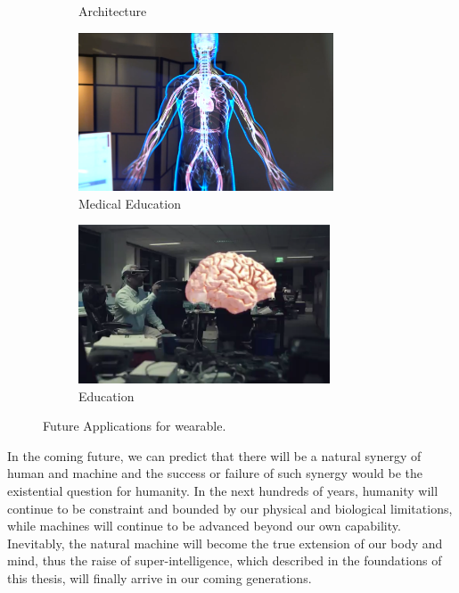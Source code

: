 \begin{figure}
\begin{subfigure}[b]{3.0in}
  \caption{Architecture}
  \label{fig:architecture}
\end{subfigure}
\begin{subfigure}[b]{3.0in}
\centering
  \includegraphics[height=1.85in]{ch7/figures/future/medical.png} 
  \caption{Medical Education}
  \label{fig:m_education}
\end{subfigure}
\begin{subfigure}[b]{3.0in}
\centering
  \includegraphics[height=1.85in]{ch7/figures/future/education.png} 
  \caption{Education}
  \label{fig:education}
\end{subfigure}
\caption{Future Applications for wearable. }
\label{fig:futureAR}
\end{figure}

In the coming future, we can predict that there will be a natural synergy of human and machine and the success or failure of such synergy would be the existential question for humanity. In the next hundreds of years, humanity will continue to be constraint and bounded by our physical and biological limitations, while machines will continue to be advanced beyond our own capability. Inevitably, the natural machine will become the true extension of our body and mind, thus the raise of super-intelligence, which described in the foundations of this thesis, will finally arrive in our coming generations.

